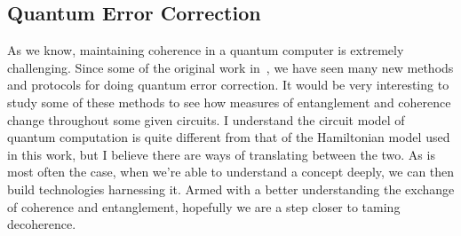 \documentclass[11pt,english]{article}
\theoremstyle{definition}
\begin{document}
\subsection{Quantum Error Correction}
As we know, maintaining coherence in a quantum computer is extremely challenging. Since some of the original work in~\cite{error-correction}, we have seen many new methods and protocols for doing quantum error correction. It would be very interesting to study some of these methods to see how measures of entanglement and coherence change throughout some given circuits. I understand the circuit model of quantum computation is quite different from that of the Hamiltonian model used in this work, but I believe there are ways of translating between the two. As is most often the case, when we're able to understand a concept deeply, we can then build technologies harnessing it. Armed with a better understanding the exchange of coherence and entanglement, hopefully we are a step closer to taming decoherence.

\clearpage


\end{document}
